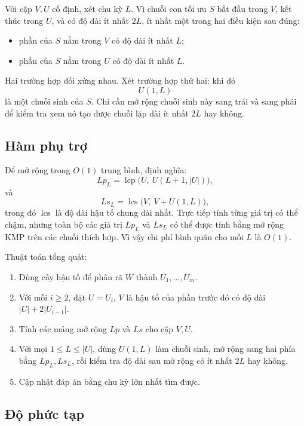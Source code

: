 \documentclass[11pt]{article}
\begin{document}
Với cặp \(V,U\) cố định, xét chu kỳ \(L\). Vì chuỗi con tối ưu \(S\) bắt đầu
trong \(V\), kết thúc trong \(U\), và có độ dài ít nhất \(2L\), ít nhất một
trong hai điều kiện sau đúng:

\begin{itemize}
  \item phần của \(S\) nằm trong \(V\) có độ dài ít nhất \(L\);
  \item phần của \(S\) nằm trong \(U\) có độ dài ít nhất \(L\).
\end{itemize}

Hai trường hợp đối xứng nhau. Xét trường hợp thứ hai: khi đó
\[
  U(1,L)
\]
là một chuỗi sinh của \(S\). Chỉ cần mở rộng chuỗi sinh này sang trái và sang
phải để kiểm tra xem nó tạo được chuỗi lặp dài ít nhất \(2L\) hay không.

\subsection{Hàm phụ trợ}

Để mở rộng trong \(O(1)\) trung bình, định nghĩa:
\[
  \mathit{Lp}_L=\operatorname{lcp}\bigl(U,\ U(L+1,|U|)\bigr),
\]
và
\[
  \mathit{Ls}_L=\operatorname{lcs}\bigl(V,\ V+U(1,L)\bigr),
\]
trong đó \(\operatorname{lcs}\) là độ dài hậu tố chung dài nhất. Trực tiếp
tính từng giá trị có thể chậm, nhưng toàn bộ các giá trị \(\mathit{Lp}_L\) và
\(\mathit{Ls}_L\) có thể được tính bằng mở rộng KMP trên các chuỗi thích hợp.
Vì vậy chi phí bình quân cho mỗi \(L\) là \(O(1)\).

Thuật toán tổng quát:

\begin{enumerate}
  \item Dùng cây hậu tố để phân rã \(W\) thành \(U_1,\ldots,U_m\).
  \item Với mỗi \(i\ge 2\), đặt \(U=U_i\), \(V\) là hậu tố của phần trước đó
  có độ dài \(|U|+2|U_{i-1}|\).
  \item Tính các mảng mở rộng \(\mathit{Lp}\) và \(\mathit{Ls}\) cho cặp
  \(V,U\).
  \item Với mọi \(1\le L\le |U|\), dùng \(U(1,L)\) làm chuỗi sinh, mở rộng
  sang hai phía bằng \(\mathit{Lp}_L,\mathit{Ls}_L\), rồi kiểm tra độ dài sau
  mở rộng có ít nhất \(2L\) hay không.
  \item Cập nhật đáp án bằng chu kỳ lớn nhất tìm được.
\end{enumerate}

\subsection{Độ phức tạp}
\end{document}
